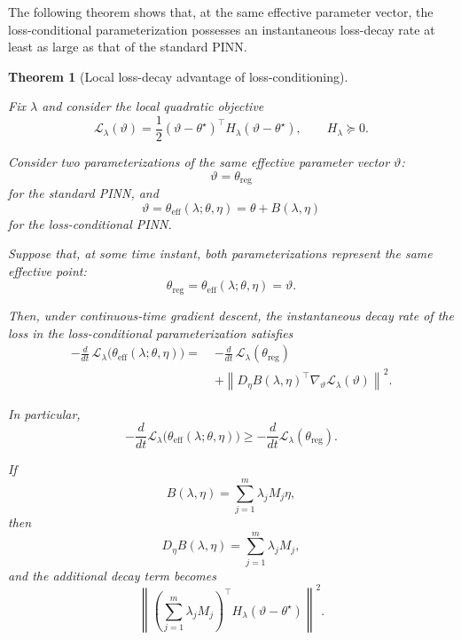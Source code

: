 \documentclass{article}
\theoremstyle{plain}
\newtheorem{theorem}{Theorem}[section]
\theoremstyle{definition}
\theoremstyle{remark}
\begin{document}
The following theorem shows that, at the same effective parameter
vector, the loss-conditional parameterization possesses an
instantaneous loss-decay rate at least as large as that of the
standard PINN.

\begin{theorem}[Local loss-decay advantage of loss-conditioning]
\label{thm:local_decay_lc_pinn}

Fix $\lambda$ and consider the local quadratic objective
\[
    \mathcal{L}_{\lambda}(\vartheta)
    =
    \frac12
    (\vartheta-\theta^\star)^\top
    H_\lambda
    (\vartheta-\theta^\star),
    \qquad
    H_\lambda \succeq 0 .
\]

Consider two parameterizations of the same effective parameter vector
$\vartheta$:
\[
    \vartheta = \theta_{\mathrm{reg}}
\]
for the standard PINN, and
\[
    \vartheta
    =
    \theta_{\mathrm{eff}}(\lambda;\theta,\eta)
    =
    \theta + B(\lambda,\eta)
\]
for the loss-conditional PINN.

Suppose that, at some time instant, both parameterizations represent
the same effective point:
\[
    \theta_{\mathrm{reg}}
    =
    \theta_{\mathrm{eff}}(\lambda;\theta,\eta)
    =
    \vartheta .
\]

Then, under continuous-time gradient descent, the instantaneous decay
rate of the loss in the loss-conditional parameterization satisfies
\[
\begin{aligned}
    -\frac{d}{dt}\,
    \mathcal{L}_{\lambda}
    \!\bigl(
        \theta_{\mathrm{eff}}(\lambda;\theta,\eta)
    \bigr)
    =\;&
    -\frac{d}{dt}\,
    \mathcal{L}_{\lambda}
    (\theta_{\mathrm{reg}}) \\
    &+
    \left\|
        D_\eta B(\lambda,\eta)^\top
        \nabla_\vartheta
        \mathcal{L}_{\lambda}(\vartheta)
    \right\|^2 .
\end{aligned}
\]

In particular,
\[
    -\frac{d}{dt}
    \mathcal{L}_{\lambda}
    \bigl(
        \theta_{\mathrm{eff}}(\lambda;\theta,\eta)
    \bigr)
    \geq
    -\frac{d}{dt}
    \mathcal{L}_{\lambda}
    (\theta_{\mathrm{reg}}).
\]

If
\[
    B(\lambda,\eta)
    =
    \sum_{j=1}^m
    \lambda_j M_j \eta,
\]
then
\[
    D_\eta B(\lambda,\eta)
    =
    \sum_{j=1}^m
    \lambda_j M_j,
\]
and the additional decay term becomes
\[
    \left\|
        \left(
            \sum_{j=1}^m
            \lambda_j M_j
        \right)^\top
        H_\lambda
        (\vartheta-\theta^\star)
    \right\|^2 .
\]
\end{theorem}
\end{document}
